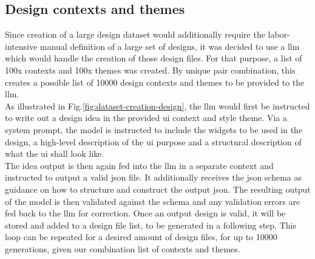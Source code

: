\documentclass[Bachelor, BIC, english, fhCitStyle, IEEE]{BASE/twbook} %
\begin{document}
\subsection{Design contexts and themes}
Since creation of a large design dataset would additionally require the labor-intensive manual definition of a large set of designs, it was decided to use a \ac{llm} which would handle the creation of those design files. For that purpose, a list of 100x contexts and 100x themes was created. By unique pair combination, this creates a possible list of 10000 design contexts and themes to be provided to the \ac{llm}.\\
As illustrated in Fig.\ref{fig:dataset-creation-design}, the \ac{llm} would first be instructed to write out a design idea in the provided \ac{ui} context and style theme. Via a system prompt, the model is instructed to include the widgets to be used in the design, a high-level description of the \ac{ui} purpose and a structural description of what the \ac{ui} shall look like.\\
The idea output is then again fed into the \ac{llm} in a separate context and instructed to output a valid \ac{json} file. It additionally receives the \ac{json} schema as guidance on how to structure and construct the output \ac{json}. The resulting output of the model is then validated against the schema and any validation errors are fed back to the \ac{llm} for correction. Once an output design is valid, it will be stored and added to a design file list, to be generated in a following step. This loop can be repeated for a desired amount of design files, for up to 10000 generations, given our combination list of contexts and themes.
\end{document}
